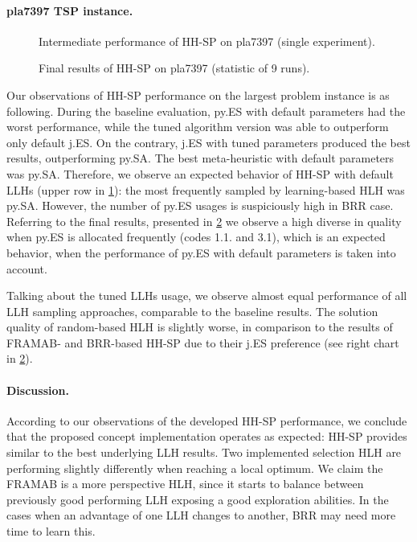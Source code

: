 \paragraph{pla7397 TSP instance.}
\begin{figure}[t]
	\centering
	\vspace{-20pt}
	
	\caption{Intermediate performance of HH-SP on pla7397 (single experiment).}
	\vspace{-10pt}
	\label{eval:pict:hh-sp:pla7397 intermediate}
\end{figure}

\begin{figure}[b]
	\centering
	\vspace{-20pt}
	
	\caption{Final results of HH-SP on pla7397 (statistic of 9 runs).}
	\vspace{-5pt}
	\label{eval:pict:hh-sp:pla7397 final}
\end{figure}
Our observations of HH-SP performance on the largest problem instance is as following. During the baseline evaluation, py.ES with default parameters had the worst performance, while the tuned algorithm version was able to outperform only default j.ES. On the contrary, j.ES with tuned parameters produced the best results, outperforming py.SA. The best meta-heuristic with default parameters was py.SA. Therefore, we observe an expected behavior of HH-SP with default LLHs (upper row in \cref{eval:pict:hh-sp:pla7397 intermediate}): the most frequently sampled by learning-based HLH was py.SA. However, the number of py.ES usages is suspiciously high in BRR case. Referring to the final results, presented in \cref{eval:pict:hh-sp:pla7397 final} we observe a high diverse in quality when py.ES is allocated frequently (codes 1.1. and 3.1), which is an expected behavior, when the performance of py.ES with default parameters is taken into account.

Talking about the tuned LLHs usage, we observe almost equal performance of all LLH sampling approaches, comparable to the baseline results. The solution quality of random-based HLH is slightly worse, in comparison to the results of FRAMAB- and BRR-based HH-SP due to their j.ES preference (see right chart in \cref{eval:pict:hh-sp:pla7397 final}).

\paragraph{Discussion.} According to our observations of the developed HH-SP performance, we conclude that the proposed concept implementation operates as expected: HH-SP provides similar to the best underlying LLH results. Two implemented selection HLH are performing slightly differently when reaching a local optimum. We claim the FRAMAB is a more perspective HLH, since it starts to balance between previously good performing LLH exposing a good exploration abilities. In the cases when an advantage of one LLH changes to another, BRR may need more time to learn this.

